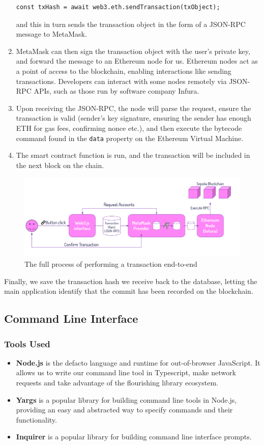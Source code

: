 \documentclass[12pt,a4paper]{article}
\begin{document}
\begin{enumerate}
\begin{lstlisting}
const txHash = await web3.eth.sendTransaction(txObject);
        \end{lstlisting}
        and this in turn sends the transaction object in the form of a JSON-RPC message to MetaMask. 
    \item MetaMask can then sign the transaction object with the user's private key, and forward the message to an Ethereum node for us. Ethereum nodes act as a point of access to the blockchain, enabling interactions like sending transactions. Developers can interact with some nodes remotely via JSON-RPC APIs, such as those run by software company Infura.
    \item Upon receiving the JSON-RPC, the node will parse the request, ensure the transaction is valid (sender's key signature, ensuring the sender has enough ETH for gas fees, confirming nonce etc.), and then execute the bytecode command found in the \verb|data| property on the Ethereum Virtual Machine.
    \item The smart contract function is run, and the transaction will be included in the next block on the chain.
\end{enumerate}
\begin{figure}[H]
    \centering
    \includegraphics[scale=0.6]{bchain.png}
    \caption{The full process of performing a transaction end-to-end}
\end{figure}
Finally, we save the transaction hash we receive back to the database, letting the main application identify that the commit has been recorded on the blockchain.
\subsection{Command Line Interface}
\subsubsection{Tools Used}
\begin{itemize}
    \item \textbf{Node.js} is the defacto language and runtime for out-of-browser JavaScript. It allows us to write our command line tool in Typescript, make network requests and take advantage of the flourishing library ecosystem.
    \item \textbf{Yargs} is a popular library for building command line tools in Node.js, providing an easy and abstracted way to specify commands and their functionality.
    \item \textbf{Inquirer} is a popular library for building command line interface prompts.
\end{itemize}
\end{document}
